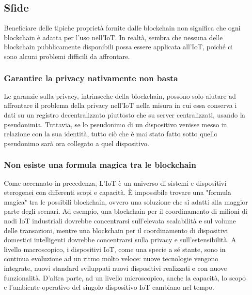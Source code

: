 \subsection{Sfide}
Beneficiare delle tipiche proprietà fornite dalle blockchain non significa che ogni blockchain è adatta per l'uso nell'IoT. In realtà, sembra che nessuna delle blockchain pubblicamente disponibili possa essere applicata all'IoT, poiché ci sono alcuni problemi difficili da affrontare.

\subsubsection{Garantire la privacy nativamente non basta}
Le garanzie sulla privacy, intrinseche della blockchain, possono solo aiutare ad affrontare il problema della privacy
nell'IoT nella misura in cui essa conserva i dati su un registro decentralizzato piuttosto che su server centralizzati, usando la pseudonimia. Tuttavia, se lo pseudonimo di un dispositivo venisse messo in relazione con la sua identità, tutto ciò che è mai stato fatto sotto quello pseudonimo sarà ora collegato a quel dispositivo.

\subsubsection{Non esiste una formula magica tra le blockchain}
Come accennato in precedenza, L'IoT è un universo di sistemi e dispositivi eterogenei con differenti scopi e capacità. È impossibile trovare una "formula magica" tra le possibili blockchain, ovvero una soluzione che si adatti alla maggior parte degli scenari. Ad esempio, una blockchain per il coordinamento di milioni di nodi IoT industriali dovrebbe concentrarsi sull'elevata scalabilità e sul volume delle transazioni, mentre una blockchain per il coordinamento di dispositivi domestici intelligenti dovrebbe concentrarsi sulla privacy e sull'estensibilità. A livello macroscopico, i dispositivi IoT, come una specie a sé stante, sono in continua evoluzione ad un ritmo molto veloce: nuove tecnologie vengono integrate, nuovi standard sviluppati nuovi dispositivi realizzati e con nuove funzionalità. D'altra parte, ad un livello microscopico, anche la capacità, lo scopo e l'ambiente operativo del singolo dispositivo IoT cambiano nel tempo.

